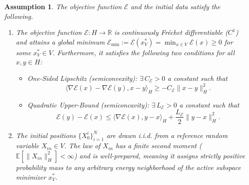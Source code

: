 \documentclass[12pt]{amsart}
\numberwithin{equation}{section}
\newtheorem{assumption}[theorem]{Assumption}
\begin{document}
\begin{assumption}%
\label{assump:error_framework} The objective function $\mathscr{E}$  and the initial data satisfy the following.
\begin{enumerate}

    \item The objective function $\mathscr{E}: H \to \mathbb{R}$ is continuously Fr\'echet differentiable ($C^1$) and attains a global minimum $\mathscr{E}_{\min} := \mathscr{E}(x_V^*) = \min_{x \in V} \mathscr{E}(x) \ge 0$ for some $x_V^* \in V$. Furthermore, it satisfies the following two conditions for all $x, y \in H$:
    \begin{itemize}
        \item \textit{One-Sided Lipschitz (semiconvexity):}  $\exists\,C_{\mathscr{E}} > 0$ a constant such that
        \begin{equation}\label{eq:osl_condition}
            \langle \nabla \mathscr{E}(x) - \nabla \mathscr{E}(y), x - y \rangle_H \ge -C_{\mathscr{E}} \|x - y\|_H^2.
        \end{equation}
        \item \textit{Quadratic Upper-Bound (semiconcavity):} $\exists\,L_{\mathscr{E}} > 0$ a constant such that
        \begin{equation}\label{eq:quadratic_condition}
            \mathscr{E}(y) - \mathscr{E}(x) \le \langle \nabla \mathscr{E}(x), y - x \rangle_H + \frac{L_{\mathscr{E}}}{2} \|y - x\|_H^2.
        \end{equation}
    \end{itemize}
    \item %
    The initial positions $\{X_0^i\}_{i=1}^N$ are drawn i.i.d. from a reference random variable $X_{in} \in V$. The law of $X_{in}$ has a finite second moment ($\mathbb{E}[\|X_{in}\|_H^2] < \infty$) and is well-prepared, meaning it assigns strictly positive probability mass to any arbitrary energy neighborhood of the active subspace minimizer $x_V^*$.
\end{enumerate}
\end{assumption}
\end{document}
